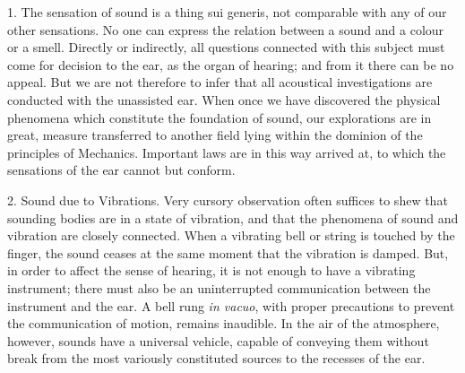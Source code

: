 

1. The sensation of sound is a thing sui generis, not
comparable with any of our other sensations. No one can express the relation
between a sound and a colour or a smell. Directly or indirectly, all questions
connected with this subject must come for decision to the ear, as the organ of
hearing; and from it there can be no appeal. But we are not therefore to infer
that all acoustical investigations are conducted with the unassisted ear. When
once we have discovered the physical phenomena which constitute the foundation
of sound, our explorations are in great, measure transferred to another field
lying within the dominion of the principles of Mechanics. Important laws are in
this way arrived at, to which the sensations of the ear cannot but conform.

2. Sound due to Vibrations. Very cursory observation often suffices to shew
that sounding bodies are in
a state of vibration, and that the phenomena of sound and vibration are closely
connected. When a vibrating bell or string is touched by the finger, the sound
ceases at the same moment that the vibration is damped. But, in order to affect
the sense of hearing, it is not enough to have a vibrating instrument; there
must also be an uninterrupted communication between the instrument and the ear.
A bell rung \textit{in vacuo}, with proper precautions to prevent the
communication of motion, remains inaudible. In the air of the atmosphere,
however, sounds have a universal vehicle, capable of conveying them without
break from the most variously constituted sources to the recesses of the ear.

